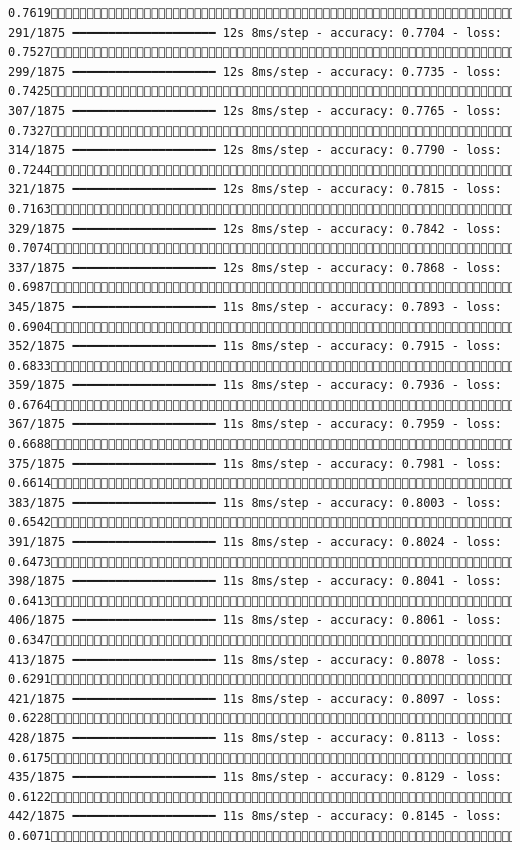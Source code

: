 \documentclass[
  letterpaper,
  DIV=11,
  numbers=noendperiod]{scrreprt}
\begin{document}
\begin{verbatim}
0.7619 291/1875 ━━━━━━━━━━━━━━━━━━━━ 12s 8ms/step - accuracy: 0.7704 - loss: 0.7527 299/1875 ━━━━━━━━━━━━━━━━━━━━ 12s 8ms/step - accuracy: 0.7735 - loss: 0.7425 307/1875 ━━━━━━━━━━━━━━━━━━━━ 12s 8ms/step - accuracy: 0.7765 - loss: 0.7327 314/1875 ━━━━━━━━━━━━━━━━━━━━ 12s 8ms/step - accuracy: 0.7790 - loss: 0.7244 321/1875 ━━━━━━━━━━━━━━━━━━━━ 12s 8ms/step - accuracy: 0.7815 - loss: 0.7163 329/1875 ━━━━━━━━━━━━━━━━━━━━ 12s 8ms/step - accuracy: 0.7842 - loss: 0.7074 337/1875 ━━━━━━━━━━━━━━━━━━━━ 12s 8ms/step - accuracy: 0.7868 - loss: 0.6987 345/1875 ━━━━━━━━━━━━━━━━━━━━ 11s 8ms/step - accuracy: 0.7893 - loss: 0.6904 352/1875 ━━━━━━━━━━━━━━━━━━━━ 11s 8ms/step - accuracy: 0.7915 - loss: 0.6833 359/1875 ━━━━━━━━━━━━━━━━━━━━ 11s 8ms/step - accuracy: 0.7936 - loss: 0.6764 367/1875 ━━━━━━━━━━━━━━━━━━━━ 11s 8ms/step - accuracy: 0.7959 - loss: 0.6688 375/1875 ━━━━━━━━━━━━━━━━━━━━ 11s 8ms/step - accuracy: 0.7981 - loss: 0.6614 383/1875 ━━━━━━━━━━━━━━━━━━━━ 11s 8ms/step - accuracy: 0.8003 - loss: 0.6542 391/1875 ━━━━━━━━━━━━━━━━━━━━ 11s 8ms/step - accuracy: 0.8024 - loss: 0.6473 398/1875 ━━━━━━━━━━━━━━━━━━━━ 11s 8ms/step - accuracy: 0.8041 - loss: 0.6413 406/1875 ━━━━━━━━━━━━━━━━━━━━ 11s 8ms/step - accuracy: 0.8061 - loss: 0.6347 413/1875 ━━━━━━━━━━━━━━━━━━━━ 11s 8ms/step - accuracy: 0.8078 - loss: 0.6291 421/1875 ━━━━━━━━━━━━━━━━━━━━ 11s 8ms/step - accuracy: 0.8097 - loss: 0.6228 428/1875 ━━━━━━━━━━━━━━━━━━━━ 11s 8ms/step - accuracy: 0.8113 - loss: 0.6175 435/1875 ━━━━━━━━━━━━━━━━━━━━ 11s 8ms/step - accuracy: 0.8129 - loss: 0.6122 442/1875 ━━━━━━━━━━━━━━━━━━━━ 11s 8ms/step - accuracy: 0.8145 - loss: 0.6071 
\end{verbatim}
\end{document}
